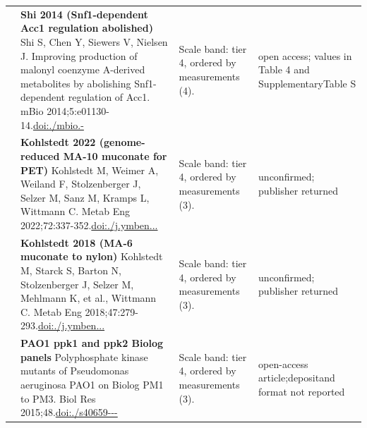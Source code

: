 \begin{landscape}
\begin{longtable}{@{}r@{\hspace{4pt}} L{78mm} L{72mm} L{76mm}@{}}
 & \textbf{Shi 2014 (Snf1-dependent Acc1 regulation abolished)} \newline Shi S, Chen Y, Siewers V, Nielsen J. Improving production of malonyl coenzyme A-derived metabolites by abolishing Snf1-dependent regulation of Acc1. mBio 2014;5:e01130-14.\newline \href{https://doi.org/10.1128/mbio.01130-14}{doi:./\allowbreak mbio.-} & Scale band: tier 4, ordered by measurements (4). & open acc\allowbreak ess; val\allowbreak ues in T\allowbreak able 4 a\allowbreak nd Suppl\allowbreak ementary\allowbreak  Table S \\
 & \textbf{Kohlstedt 2022 (genome-reduced MA-10 muconate for PET)} \newline Kohlstedt M, Weimer A, Weiland F, Stolzenberger J, Selzer M, Sanz M, Kramps L, Wittmann C. Metab Eng 2022;72:337-352.\newline \href{https://doi.org/10.1016/j.ymben.2022.05.001}{doi:./\allowbreak j.\allowbreak ymben...} & Scale band: tier 4, ordered by measurements (3). & unconfir\allowbreak med; pub\allowbreak lisher r\allowbreak eturned  \\
 & \textbf{Kohlstedt 2018 (MA-6 muconate to nylon)} \newline Kohlstedt M, Starck S, Barton N, Stolzenberger J, Selzer M, Mehlmann K, et al., Wittmann C. Metab Eng 2018;47:279-293.\newline \href{https://doi.org/10.1016/j.ymben.2018.03.003}{doi:./\allowbreak j.\allowbreak ymben...} & Scale band: tier 4, ordered by measurements (3). & unconfir\allowbreak med; pub\allowbreak lisher r\allowbreak eturned  \\
 & \textbf{PAO1 ppk1 and ppk2 Biolog panels} \newline Polyphosphate kinase mutants of Pseudomonas aeruginosa PAO1 on Biolog PM1 to PM3. Biol Res 2015;48.\newline \href{https://doi.org/10.1186/s40659-015-0012-0}{doi:./\allowbreak s40659---} & Scale band: tier 4, ordered by measurements (3). & open-\allowbreak access \allowbreak article;\allowbreak  deposit\allowbreak  and for\allowbreak mat not \allowbreak reported \\

\end{longtable}
\end{landscape}
